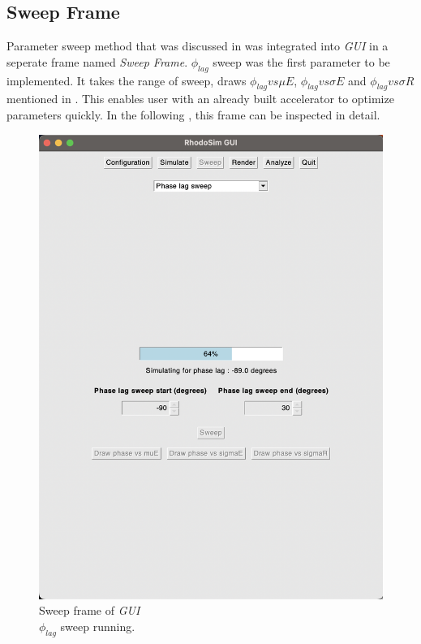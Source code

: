 \documentclass[a4paper,oneside,12pt]{report}
\numberwithin{equation}{chapter}
\begin{document}
\subsection{Sweep Frame}
Parameter sweep method that was discussed in  was integrated into \textit{GUI} in a seperate frame named \textit{Sweep Frame}.
$\phi_{lag}$ sweep was the first parameter to be implemented. 
It takes the range of sweep, draws $\phi_{lag} vs \mu E$, $\phi_{lag} vs \sigma E$ and $\phi_{lag} vs \sigma R$ mentioned in .
This enables user with an already built accelerator to optimize \egun parameters quickly. 
In the following , this frame can be inspected in detail.
\begin{figure}
    \centering
    \includegraphics[width=0.8\linewidth]{./figures/rhodoSim/GUI_sweep_running.png}
    \caption{Sweep frame of \textit{GUI} \\ $\phi_{lag}$ sweep running.}
    \label{fig:gui_sweep_running}
\end{figure}
\end{document}
